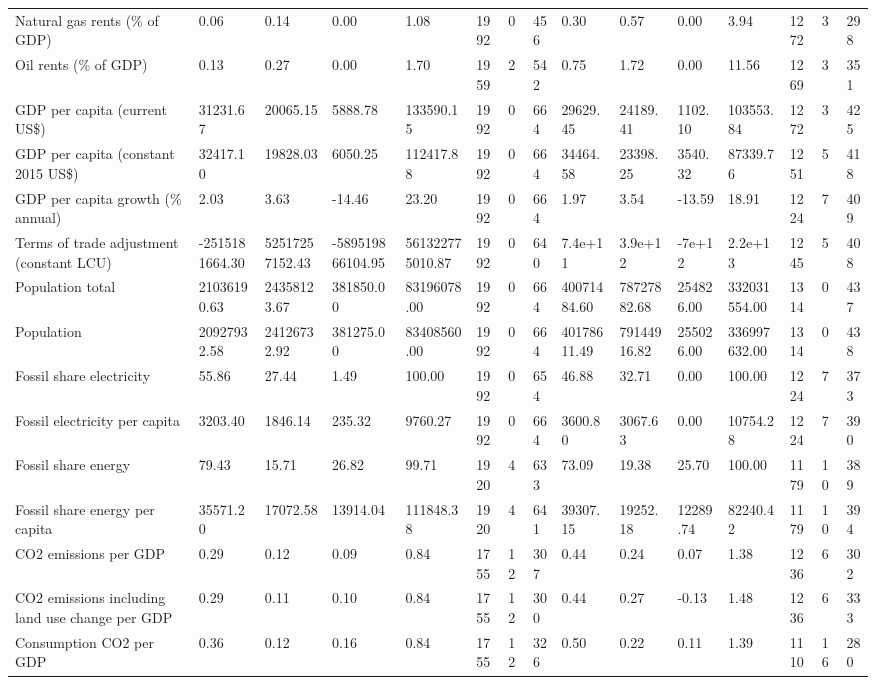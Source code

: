 \begin{longtable}{lllllllllllllll}
\addlinespace
Natural gas rents (\% of GDP) & 0.06 & 0.14 & 0.00 & 1.08 & 1992 & 0 & 456 & 0.30 & 0.57 & 0.00 & 3.94 & 1272 & 3 & 298\\
Oil rents (\% of GDP) & 0.13 & 0.27 & 0.00 & 1.70 & 1959 & 2 & 542 & 0.75 & 1.72 & 0.00 & 11.56 & 1269 & 3 & 351\\
GDP per capita (current US\$) & 31231.67 & 20065.15 & 5888.78 & 133590.15 & 1992 & 0 & 664 & 29629.45 & 24189.41 & 1102.10 & 103553.84 & 1272 & 3 & 425\\
GDP per capita (constant 2015 US\$) & 32417.10 & 19828.03 & 6050.25 & 112417.88 & 1992 & 0 & 664 & 34464.58 & 23398.25 & 3540.32 & 87339.76 & 1251 & 5 & 418\\
GDP per capita growth (\% annual) & 2.03 & 3.63 & -14.46 & 23.20 & 1992 & 0 & 664 & 1.97 & 3.54 & -13.59 & 18.91 & 1224 & 7 & 409\\
\addlinespace
Terms of trade adjustment (constant LCU) & -2515181664.30 & 52517257152.43 & -589519866104.95 & 561322775010.87 & 1992 & 0 & 640 & 7.4e+11 & 3.9e+12 & -7e+12 & 2.2e+13 & 1245 & 5 & 408\\
Population total & 21036190.63 & 24358123.67 & 381850.00 & 83196078.00 & 1992 & 0 & 664 & 40071484.60 & 78727882.68 & 254826.00 & 332031554.00 & 1314 & 0 & 437\\
Population & 20927932.58 & 24126732.92 & 381275.00 & 83408560.00 & 1992 & 0 & 664 & 40178611.49 & 79144916.82 & 255026.00 & 336997632.00 & 1314 & 0 & 438\\
Fossil share electricity & 55.86 & 27.44 & 1.49 & 100.00 & 1992 & 0 & 654 & 46.88 & 32.71 & 0.00 & 100.00 & 1224 & 7 & 373\\
Fossil electricity per capita & 3203.40 & 1846.14 & 235.32 & 9760.27 & 1992 & 0 & 664 & 3600.80 & 3067.63 & 0.00 & 10754.28 & 1224 & 7 & 390\\
\addlinespace
Fossil share energy & 79.43 & 15.71 & 26.82 & 99.71 & 1920 & 4 & 633 & 73.09 & 19.38 & 25.70 & 100.00 & 1179 & 10 & 389\\
Fossil share energy per capita & 35571.20 & 17072.58 & 13914.04 & 111848.38 & 1920 & 4 & 641 & 39307.15 & 19252.18 & 12289.74 & 82240.42 & 1179 & 10 & 394\\
CO2 emissions per GDP & 0.29 & 0.12 & 0.09 & 0.84 & 1755 & 12 & 307 & 0.44 & 0.24 & 0.07 & 1.38 & 1236 & 6 & 302\\
CO2 emissions including land use change per GDP & 0.29 & 0.11 & 0.10 & 0.84 & 1755 & 12 & 300 & 0.44 & 0.27 & -0.13 & 1.48 & 1236 & 6 & 333\\
Consumption CO2 per GDP & 0.36 & 0.12 & 0.16 & 0.84 & 1755 & 12 & 326 & 0.50 & 0.22 & 0.11 & 1.39 & 1110 & 16 & 280\\

\end{longtable}
